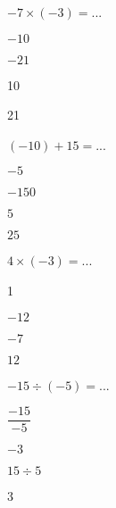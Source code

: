 

\begin{QCM}
\begin{GroupeQCM}

\begin{exercice}
$-7 \times (-3) =$...
\begin{ChoixQCM}{4}
\item $-10$
\item $-21$
\item 10
\item 21
\end{ChoixQCM}
\begin{corrige}
\end{corrige}
\end{exercice}




\begin{exercice}
$(-10) + 15 =$...
\begin{ChoixQCM}{4}
\item $-5$
\item $-150$
\item $5$
\item $25$
\end{ChoixQCM}
\begin{corrige}
\end{corrige}
\end{exercice}


\begin{exercice}
$4 \times (-3) =$...
\begin{ChoixQCM}{4}
\item 1
\item $-12$
\item $-7$
\item $12$
\end{ChoixQCM}
\begin{corrige}
\end{corrige}
\end{exercice}
 


\begin{exercice}
$-15 \div (-5) =$...
\begin{ChoixQCM}{4}
\item $\dfrac{-15}{-5}$
\item $-3$
\item $15 \div 5$
\item 3
\end{ChoixQCM}
\begin{corrige}
\end{corrige}
\end{exercice}



\end{GroupeQCM}
\end{QCM}
